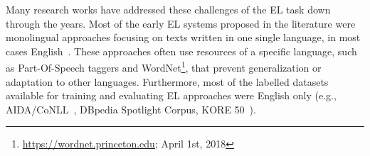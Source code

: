 \documentclass{llncs}
\begin{document}


Many research works have addressed these challenges of the EL task down through the years. Most of the early EL systems proposed in the literature were monolingual approaches focusing on texts written in one single language, in most cases English~\cite{mendes2011dbpedia,AIDA-hoffart2011robust}. These approaches often use resources of a specific language, such as Part-Of-Speech taggers and WordNet\footnote{\url{https://wordnet.princeton.edu}; April 1st, 2018}, that prevent generalization or adaptation to other languages. Furthermore, most of the labelled datasets available for training and evaluating EL approaches were English only (e.g., AIDA/CoNLL~\cite{aida2011}, DBpedia Spotlight Corpus\cite{mendes2011dbpedia}, KORE 50~\cite{kore50}). 
\end{document}

